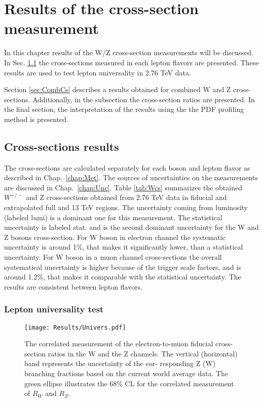 \chapter{Results of the cross-section measurement}
\minitoc

In this chapter results of the W/Z cross-section measurements will be discussed. 
In Sec. \ref{sec:flavCs} the cross-sections measured in each lepton flavors are presented. These results are used to test lepton universality in 2.76 TeV data.

Section \ref{sec:CombCs} describes a results obtained for combined W and Z cross-sections. Additionally, in the subsection the cross-section ratios are presented. In the final section, the interpretation of the results using the the PDF profiling method is presented.

\section{Cross-sections results}\label{sec:flavCs}

The cross-sections are calculated separately for each boson and lepton flavor as described in Chap.~\ref{chap:Met}. The sources of uncertainties on the measurements are discussed in Chap.~\ref{chap:Unc}. Table \ref{tab:Wcs} summarizes the obtained $W^{+/-}$ and Z cross-sections obtained from 2.76 TeV data in fiducial and extrapolated full and 13 TeV regions. The uncertainty coming from luminosity (labeled lumi) is a dominant one for this measurement. The statistical uncertainty is labeled stat. and is the second dominant uncertainty for the W and Z bosons cross-section. For W boson in electron channel the systematic uncertainty is around 1\%, that makes it significantly lower, than a statistical uncertainty. For W boson in a muon channel cross-sections the overall systematical uncertainty is higher because of the trigger scale factors, and is around 1.2\%, that makes it comparable with the statistical uncertainty.  The results are consistent between lepton flavors. 

%


\subsection{Lepton universality test}\label{sec:LeptUnivers}

\begin{figure}[!tb]
\begin{center}
\begin{minipage}[h]{0.8\linewidth}
\texttt{[image: Results/Univers.pdf]}
\end{minipage}
\caption{The correlated measurement of the electron-to-muon fiducial cross-section ratios in the W and the Z channels. The vertical (horizontal) band represents the uncertainty of the cor- responding Z (W) branching fractions based on the current world average data. The green ellipse illustrates the 68\% CL for the correlated measurement of $R_W$ and $R_Z$.}
\label{fig:LeptUnivers}
\end{center}
\end{figure}


